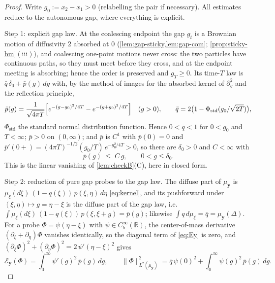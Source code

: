 \documentclass[reqno,final,11pt]{amsart}
\theoremstyle{plain}
\theoremstyle{definition}
\theoremstyle{remark}
\newcommand{\R}{\mathbb R}
\newcommand{\cE}{\mathcal E}
\begin{document}
\begin{proof}
Write $g_0:=x_2-x_1>0$ (relabelling the pair if necessary). All estimates
reduce to the autonomous gap, where everything is explicit.

Step 1: explicit gap law. At the coalescing endpoint the gap
$g_t$ is a Brownian motion of diffusivity $2$ absorbed at $0$
(\cref{lem:gap-sticky,lem:gap-com}; \cref{prop:sticky-bm}$(\mathrm{iii})$), and
coalescing one-point motions never cross: the two particles have continuous
paths, so they must meet before they cross, and at the endpoint meeting is
absorbing; hence the order is preserved and $g_T\ge0$. Its time-$T$ law is
$\bar q\,\delta_0+\bar p(g)\,dg$ with, by the method of images for the
absorbed kernel of $\partial_g^2$ and the reflection principle,
\[
  \bar p(g)=\frac{1}{\sqrt{4\pi T}}
  \Bigl[e^{-(g-g_0)^2/4T}-e^{-(g+g_0)^2/4T}\Bigr]\quad(g>0),
  \qquad
  \bar q=2\bigl(1-\Phi_{\mathrm{std}}(g_0/\sqrt{2T})\bigr),
\]
$\Phi_{\mathrm{std}}$ the standard normal distribution function. Hence
$0<\bar q<1$ for $0<g_0$ and $T<\infty$; $\bar p>0$ on $(0,\infty)$; and
$\bar p$ is $C^1$ with $\bar p(0)=0$ and
$\bar p'(0{+})=(4\pi T)^{-1/2}(g_0/T)\,e^{-g_0^2/4T}>0$, so there are
$\delta_0>0$ and $C<\infty$ with
\begin{equation}\label{eq:pbar-linear}
  \bar p(g)\;\le\;C\,g,\qquad 0<g\le\delta_0 .
\end{equation}
This is the linear vanishing of \cref{lem:checkB}(C), here in closed form.

Step 2: reduction of pure gap probes to the gap law. The diffuse part
of $\mu_{\mathbf y}$ is $\mu_\xi(d\xi)\,(1-q(\xi))\,p(\xi,\eta)\,d\eta$
\eqref{eq:kernel}, and its pushforward under $(\xi,\eta)\mapsto g=\eta-\xi$ is
the diffuse part of the gap law, i.e.
$\int\mu_\xi(d\xi)\,(1-q(\xi))\,p(\xi,\xi+g)=\bar p(g)$; likewise
$\int q\,d\mu_\xi=\bar q=\mu_{\mathbf y}(\Delta)$. For a probe
$\Phi=\psi(\eta-\xi)$ with $\psi\in C^\infty_b(\R)$, the center-of-mass
derivative $(\partial_\xi+\partial_\eta)\Phi$ vanishes identically, so the
diagonal term of \eqref{eq:Ey} is zero, and
$(\partial_\xi\Phi)^2+(\partial_\eta\Phi)^2=2\,\psi'(\eta-\xi)^2$ gives
\begin{equation}\label{eq:gap-energy}
  \cE_{\mathbf y}(\Phi)=\int_0^\infty\psi'(g)^2\,\bar p(g)\,dg,
  \qquad
  \|\Phi\|^2_{L^2(\mu_{\mathbf y})}
  =\bar q\,\psi(0)^2+\int_0^\infty\psi(g)^2\,\bar p(g)\,dg .
\end{equation}


\end{proof}
\end{document}
